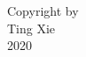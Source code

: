 


\begin{center}
\null
\vfill
\begin{doublespace}
Copyright by \\ 
Ting Xie \\ 
2020\\
\end{doublespace}
\end{center}
